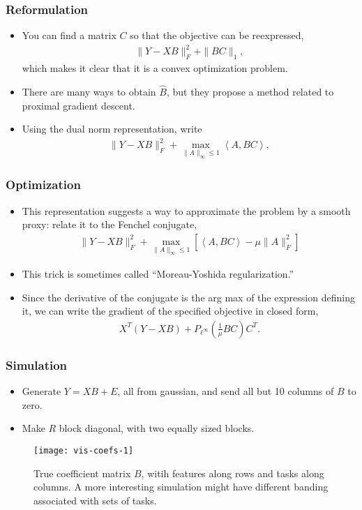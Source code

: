\documentclass[10pt]{beamer}\usepackage[]{graphicx}\usepackage[]{color}
\begin{document}
\begin{frame}
  \frametitle{Reformulation}
  \begin{itemize}
  \item You can find a matrix $C$ so that the objective can be reexpressed,
    \begin{align}
      \|Y - XB\|_{F}^{2} + \|BC\|_{1},
    \end{align}
    which makes it clear that it is a convex optimization problem.
  \item There are many ways to obtain $\hat{B}$, but they propose a method
    related to proximal gradient descent.
  \item Using the dual norm representation, write
    \begin{align}
      \|Y - XB\|_{F}^{2} + \max_{\|A\|_{\infty} \leq 1}
      \left<A, BC\right>,
  \end{align}
  \end{itemize}
\end{frame}

\begin{frame}
  \frametitle{Optimization}
  \begin{itemize}
  \item This representation suggests a way to approximate the problem by a smooth proxy: relate it to the Fenchel conjugate,
    \begin{align}
      \|Y - XB\|_{F}^{2} + \max_{\|A\|_{\infty} \leq 1}\left[\left<A, BC\right> - \mu\|A\|_{F}^{2}\right]
    \end{align}
    \item This trick is sometimes called ``Moreau-Yoshida regularization.''
  \item Since the derivative of the conjugate is the arg max of the expression defining it, we can write the gradient of the specified objective in closed form,
    \begin{align}
      X^{T}\left(Y - XB\right) + P_{\ell^{\infty}}\left(\frac{1}{\mu}BC\right)C^{T}.
    \end{align}
  \end{itemize}
\end{frame}

\begin{frame}
  \frametitle{Simulation}
  \begin{itemize}
  \item Generate $Y = XB + E$, all from gaussian, and send all but 10 columns
    of $B$ to zero.
  \item Make $R$ block diagonal, with two equally sized blocks.
  \end{itemize}
  \begin{figure}
    \texttt{[image: vis-coefs-1]}
    \caption{True coefficient matrix $B$, witih features along rows and tasks
      along columns. A more interesting simulation might have
    different banding associated with sets of tasks.}
  \end{figure}
\end{frame}
\end{document}
